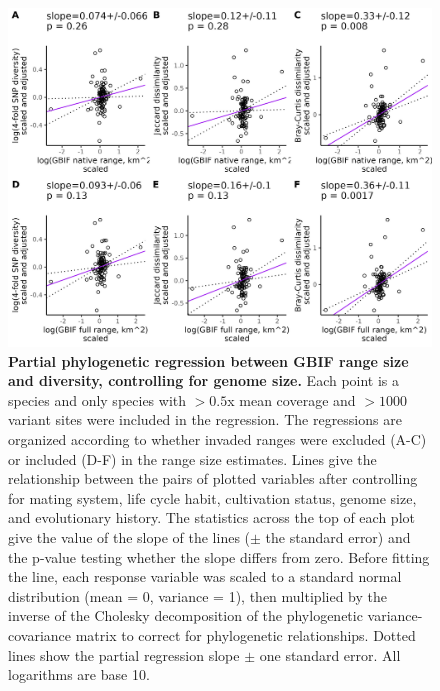 \documentclass[12pt]{article}
\begin{document}
\begin{figure}[H]
    \centering
    \includegraphics[width=\textwidth]{figures/appendix_d/gbif_area_vs_diversity_genome-size-corrected_2024-12-12.jpg}
    \caption{\textbf{Partial phylogenetic regression between GBIF range size and diversity, controlling for genome size.} Each point is a species and only species with $>0.5$x mean coverage and $>1000$ variant sites were included in the regression. The regressions are organized according to whether invaded ranges were excluded (A-C) or included (D-F) in the range size estimates. Lines give the relationship between the pairs of plotted variables after controlling for mating system, life cycle habit, cultivation status, genome size, and evolutionary history. The statistics across the top of each plot give the value of the slope of the lines ($\pm$ the standard error) and the p-value testing whether the slope differs from zero. Before fitting the line, each response variable was scaled to a standard normal distribution (mean = 0, variance = 1), then multiplied by the inverse of the Cholesky decomposition of the phylogenetic variance-covariance matrix to correct for phylogenetic relationships. Dotted lines show the partial regression slope $\pm$ one standard error. All logarithms are base 10.}
\end{figure}
\end{document}
